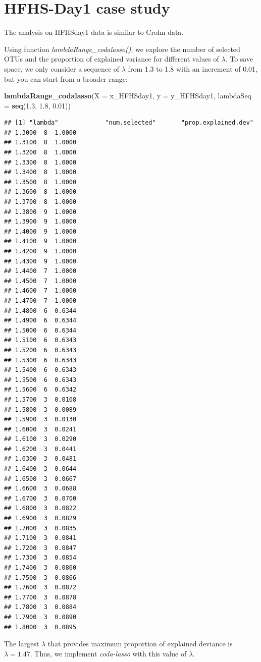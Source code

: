 \documentclass[openany]{book}
\newenvironment{Shaded}{\begin{snugshade}}{\end{snugshade}}
\newcommand{\KeywordTok}[1]{\textcolor[rgb]{0.13,0.29,0.53}{\textbf{#1}}}
\newcommand{\DataTypeTok}[1]{\textcolor[rgb]{0.13,0.29,0.53}{#1}}
\newcommand{\FloatTok}[1]{\textcolor[rgb]{0.00,0.00,0.81}{#1}}
\newcommand{\NormalTok}[1]{#1}
\begin{document}
\section{HFHS-Day1 case study}\label{hfhs-day1-case-study-2}

The analysis on HFHSday1 data is similar to Crohn data.

Using function \emph{lambdaRange\_codalasso()}, we explore the number of
selected OTUs and the proportion of explained variance for different
values of \(\lambda\). To save space, we only consider a sequence of
\(\lambda\) from 1.3 to 1.8 with an increment of 0.01, but you can start
from a broader range:

\begin{Shaded}
\begin{Highlighting}[]
\KeywordTok{lambdaRange_codalasso}\NormalTok{(}\DataTypeTok{X =}\NormalTok{ x_HFHSday1, }\DataTypeTok{y =}\NormalTok{ y_HFHSday1, }\DataTypeTok{lambdaSeq =} \KeywordTok{seq}\NormalTok{(}\FloatTok{1.3}\NormalTok{, }\FloatTok{1.8}\NormalTok{, }\FloatTok{0.01}\NormalTok{))}
\end{Highlighting}
\end{Shaded}

\begin{verbatim}
## [1] "lambda"             "num.selected"       "prop.explained.dev"
## 1.3000  8  1.0000
## 1.3100  8  1.0000
## 1.3200  8  1.0000
## 1.3300  8  1.0000
## 1.3400  8  1.0000
## 1.3500  8  1.0000
## 1.3600  8  1.0000
## 1.3700  8  1.0000
## 1.3800  9  1.0000
## 1.3900  9  1.0000
## 1.4000  9  1.0000
## 1.4100  9  1.0000
## 1.4200  9  1.0000
## 1.4300  9  1.0000
## 1.4400  7  1.0000
## 1.4500  7  1.0000
## 1.4600  7  1.0000
## 1.4700  7  1.0000
## 1.4800  6  0.6344
## 1.4900  6  0.6344
## 1.5000  6  0.6344
## 1.5100  6  0.6343
## 1.5200  6  0.6343
## 1.5300  6  0.6343
## 1.5400  6  0.6343
## 1.5500  6  0.6343
## 1.5600  6  0.6342
## 1.5700  3  0.0108
## 1.5800  3  0.0089
## 1.5900  3  0.0130
## 1.6000  3  0.0241
## 1.6100  3  0.0290
## 1.6200  3  0.0441
## 1.6300  3  0.0481
## 1.6400  3  0.0644
## 1.6500  3  0.0667
## 1.6600  3  0.0688
## 1.6700  3  0.0700
## 1.6800  3  0.0822
## 1.6900  3  0.0829
## 1.7000  3  0.0835
## 1.7100  3  0.0841
## 1.7200  3  0.0847
## 1.7300  3  0.0854
## 1.7400  3  0.0860
## 1.7500  3  0.0866
## 1.7600  3  0.0872
## 1.7700  3  0.0878
## 1.7800  3  0.0884
## 1.7900  3  0.0890
## 1.8000  3  0.0895
\end{verbatim}

The largest \(\lambda\) that provides maximum proportion of explained
deviance is \(\lambda = 1.47\). Thus, we implement \emph{coda-lasso}
with this value of \(\lambda\).
\end{document}
